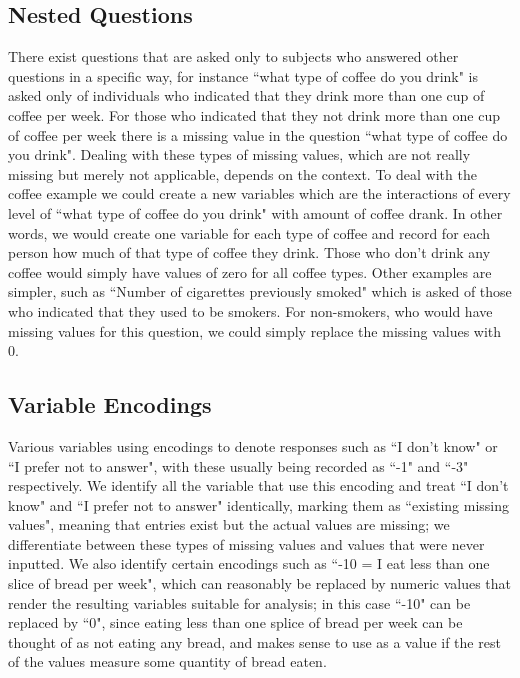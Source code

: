\documentclass{article}
\begin{document}
\subsection*{Nested Questions}
There exist questions that are asked only to subjects who answered other questions in a specific way, for instance ``what type of coffee do you drink" is asked only of individuals who indicated that they drink more than one cup of coffee per week. For those who indicated that they not drink more than one cup of coffee per week there is a missing value in the question ``what type of coffee do you drink". Dealing with these types of missing values, which are not really missing but merely not applicable, depends on the context. To deal with the coffee example we could create a new variables which are the interactions of every level of ``what type of coffee do you drink" with amount of coffee drank. In other words, we would create one variable for each type of coffee and record for each person how much of that type of coffee they drink. Those who don't drink any coffee would simply have values of zero for all coffee types. Other examples are simpler, such as ``Number of cigarettes previously smoked" which is asked of those who indicated that they used to be smokers. For non-smokers, who would have missing values for this question, we could simply replace the missing values with 0. 

\subsection*{Variable Encodings}
Various variables using encodings to denote responses such as ``I don't know" or ``I prefer not to answer", with these usually being recorded as ``-1" and ``-3" respectively. We identify all the variable that use this encoding and treat ``I don't know" and ``I prefer not to answer" identically, marking them as ``existing missing values", meaning that entries exist but the actual values are missing; we differentiate between these types of missing values and values that were never inputted. We also identify certain encodings such as ``-10 = I eat less than one slice of bread per week", which can reasonably be replaced by numeric values that render the resulting variables suitable for analysis; in this case ``-10" can be replaced by ``0", since eating less than one splice of bread per week can be thought of as not eating any bread, and makes sense to use as a value if the rest of the values measure some quantity of bread eaten. 
\end{document}
